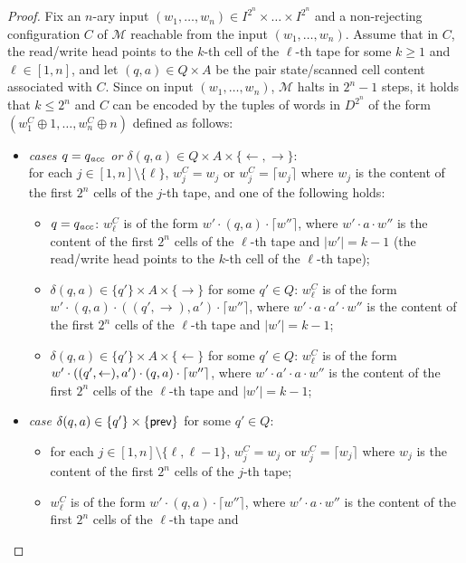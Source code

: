 \begin{proof}
Fix an $n$-ary input $(w_1,\ldots,w_n)\in I^{2^{n}}\times \ldots \times I^{2^{n}}$ and a non-rejecting configuration $C$ of $\mathcal{M}$ reachable from the input
$(w_1,\ldots,w_n)$. Assume that in $C$, the read/write head points to the $k$-th cell of the $\ell$-th tape for some $k\geq 1$ and $\ell\in[1,n]$, and let $(q,a)\in Q \times A$ be the pair state/scanned cell content associated with $C$. Since on input  $(w_1,\ldots,w_n)$, $\mathcal{M}$ halts in $2^{n}-1$ steps, it holds that $k\leq 2^{n}$ and $C$ can be encoded by the tuples   of words in $D^{2^{n}}$ of the form $(w_1^{C}\oplus 1,\ldots,w_n^{C}\oplus n)$ defined as follows:
\begin{itemize}
\item \emph{cases $q=q_{\textit{acc}}$ or $\delta(q,a)\in Q\times A \times \{\leftarrow,\rightarrow\}$}:\\ for each $j\in [1,n]\setminus \{\ell\}$,
$w_j^{C}=w_j$ or $w_j^{C}=\lceil w_j \rceil$ where $w_j$ is the content of the first $2^{n}$ cells of the $j$-th tape, and one of the following holds:
\begin{itemize}
\item $q= q_{\textit{acc}}$: $w_\ell^{C}$ is of the form $w'\cdot (q,a) \cdot \lceil w'' \rceil$, where $w'\cdot a \cdot w''$ is the content of the first $2^{n}$ cells of the $\ell$-th tape and
$|w'|= k-1$ (the read/write head points to the $k$-th cell of the $\ell$-th tape);
\item   $\delta(q,a)  \in \{q'\}\times A \times \{\rightarrow\}$ for some $q'\in Q$:
$w_\ell^{C}$ is of the form $ w'\cdot (q, a) \cdot ((q',\rightarrow),a')\cdot \lceil w''\rceil$, where $w'\cdot a \cdot a' \cdot w''$ is the content of the first $2^{n}$ cells of the $\ell$-th tape and $|w'|= k-1$;
\item   $\delta(q,a)  \in \{q'\}\times A \times \{\leftarrow\}$ for some $q'\in Q$:
$w_\ell^{C}$ is of the form $w'\cdot ((q',\leftarrow\nolinebreak ),a')\cdot (q,a) \cdot  \lceil w''\rceil$, where $w'\cdot a' \cdot a \cdot w''$ is the content of the first $2^{n}$ cells of the $\ell$-th tape and $|w'|= k-1$;
\end{itemize}
\item \emph{case  $\delta(q,a)\in \{q'\}\times\{\text{{\sffamily prev}}\}$} for some $q'\in Q$:
\begin{itemize}
\item for each $j\in [1,n]\setminus \{\ell,\ell-1\}$,
     $w_j^{C}=w_j$ or $w_j^{C}=\lceil w_j \rceil$ where $w_j$ is the content of the first $2^{n}$ cells of the $j$-th tape;
\item $w_\ell^{C}$ is of the form $ w' \cdot (q,a) \cdot  \lceil w''\rceil$, where $w'\cdot a \cdot w''$ is the content of the first $2^{n}$ cells of the $\ell$-th tape and

\end{itemize}
\end{itemize}
\end{proof}
